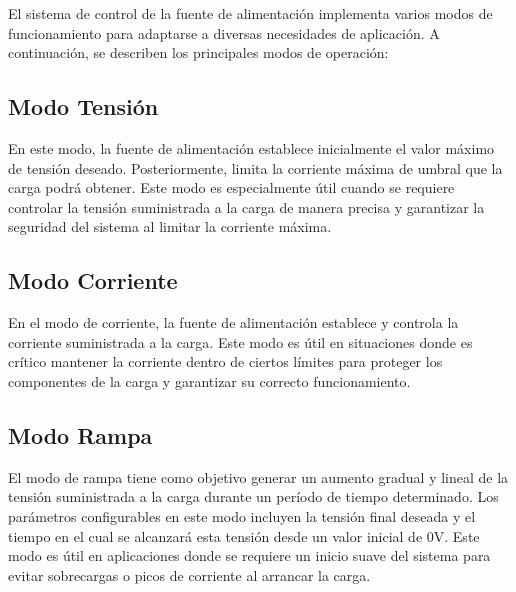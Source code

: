 El sistema de control de la fuente de alimentación implementa varios modos de funcionamiento para adaptarse a diversas necesidades de aplicación. A continuación, se describen los principales modos de operación:
\subsection{Modo Tensión}
En este modo, la fuente de alimentación establece inicialmente el valor máximo de tensión deseado. Posteriormente, limita la corriente máxima de umbral que la carga podrá obtener. Este modo es especialmente útil cuando se requiere controlar la tensión suministrada a la carga de manera precisa y garantizar la seguridad del sistema al limitar la corriente máxima.
\subsection{Modo Corriente}
En el modo de corriente, la fuente de alimentación establece y controla la corriente suministrada a la carga. Este modo es útil en situaciones donde es crítico mantener la corriente dentro de ciertos límites para proteger los componentes de la carga y garantizar su correcto funcionamiento.
\subsection{Modo Rampa}
El modo de rampa tiene como objetivo generar un aumento gradual y lineal de la tensión suministrada a la carga durante un período de tiempo determinado. Los parámetros configurables en este modo incluyen la tensión final deseada y el tiempo en el cual se alcanzará esta tensión desde un valor inicial de 0V. Este modo es útil en aplicaciones donde se requiere un inicio suave del sistema para evitar sobrecargas o picos de corriente al arrancar la carga.
